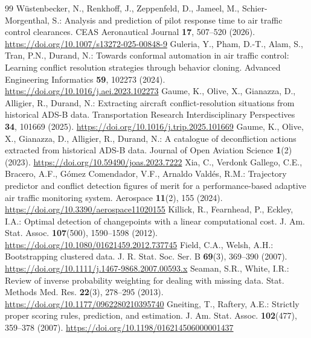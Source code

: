 \documentclass[pdflatex,sn-mathphys-num]{sn-jnl}
\begin{document}
\begin{thebibliography}{99}
 W\"ustenbecker, N., Renkhoff, J., Zeppenfeld, D., Jameel, M., Schier-Morgenthal, S.: Analysis and prediction of pilot response time to air traffic control clearances. CEAS Aeronautical Journal \textbf{17}, 507--520 (2026). \url{https://doi.org/10.1007/s13272-025-00848-9}
 Guleria, Y., Pham, D.-T., Alam, S., Tran, P.N., Durand, N.: Towards conformal automation in air traffic control: Learning conflict resolution strategies through behavior cloning. Advanced Engineering Informatics \textbf{59}, 102273 (2024). \url{https://doi.org/10.1016/j.aei.2023.102273}
 Gaume, K., Olive, X., Gianazza, D., Alligier, R., Durand, N.: Extracting aircraft conflict-resolution situations from historical ADS-B data. Transportation Research Interdisciplinary Perspectives \textbf{34}, 101669 (2025). \url{https://doi.org/10.1016/j.trip.2025.101669}
 Gaume, K., Olive, X., Gianazza, D., Alligier, R., Durand, N.: A catalogue of deconfliction actions extracted from historical ADS-B data. Journal of Open Aviation Science \textbf{1}(2) (2023). \url{https://doi.org/10.59490/joas.2023.7222}
 Xia, C., Verdonk Gallego, C.E., Bracero, A.F., G\'omez Comendador, V.F., Arnaldo Vald\'es, R.M.: Trajectory predictor and conflict detection figures of merit for a performance-based adaptive air traffic monitoring system. Aerospace \textbf{11}(2), 155 (2024). \url{https://doi.org/10.3390/aerospace11020155}
 Killick, R., Fearnhead, P., Eckley, I.A.: Optimal detection of changepoints with a linear computational cost. J. Am. Stat. Assoc. \textbf{107}(500), 1590--1598 (2012). \url{https://doi.org/10.1080/01621459.2012.737745}
 Field, C.A., Welsh, A.H.: Bootstrapping clustered data. J. R. Stat. Soc. Ser. B \textbf{69}(3), 369--390 (2007). \url{https://doi.org/10.1111/j.1467-9868.2007.00593.x}
 Seaman, S.R., White, I.R.: Review of inverse probability weighting for dealing with missing data. Stat. Methods Med. Res. \textbf{22}(3), 278--295 (2013). \url{https://doi.org/10.1177/0962280210395740}
 Gneiting, T., Raftery, A.E.: Strictly proper scoring rules, prediction, and estimation. J. Am. Stat. Assoc. \textbf{102}(477), 359--378 (2007). \url{https://doi.org/10.1198/016214506000001437}
\end{thebibliography}
\end{document}
